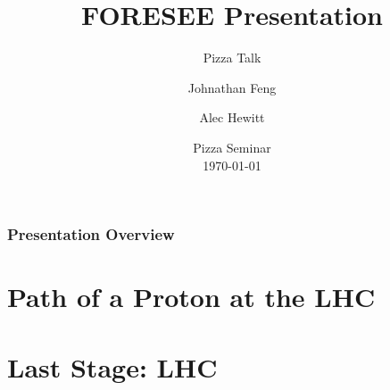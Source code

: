 \documentclass[
	11pt, %
]{beamer}
\title[Short Title]{FORESEE Presentation} %
\subtitle{Pizza Talk} %
\author[Alec Hewitt]{Johnathan Feng \and Alec Hewitt} %
\institute[UCI]{University of California, Irvine \\ \smallskip \textit{ahewitt1@uci.edu}} %
\date[\today]{Pizza Seminar \\ \today} %
\begin{document}

\begin{frame}
	\titlepage %
\end{frame}



\begin{frame}
	\frametitle{Presentation Overview} %
	
	\tableofcontents %
\end{frame}


\section{Path of a Proton at the LHC}
\section{Last Stage: LHC} 
\end{document}
